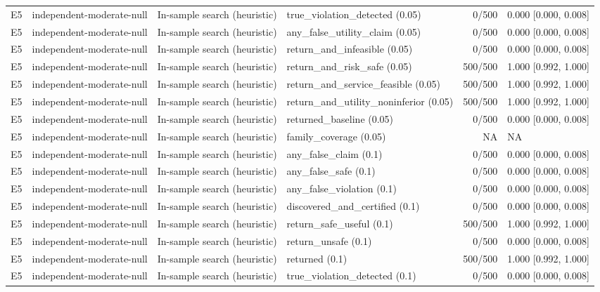 \begin{longtable}{p{.04\linewidth}p{.18\linewidth}p{.19\linewidth}p{.16\linewidth}r p{.21\linewidth}}
E5 & independent-moderate-null & In-sample search (heuristic) & true\_violation\_detected (0.05) & 0/500 & 0.000 [0.000, 0.008]\\
E5 & independent-moderate-null & In-sample search (heuristic) & any\_false\_utility\_claim (0.05) & 0/500 & 0.000 [0.000, 0.008]\\
E5 & independent-moderate-null & In-sample search (heuristic) & return\_and\_infeasible (0.05) & 0/500 & 0.000 [0.000, 0.008]\\
E5 & independent-moderate-null & In-sample search (heuristic) & return\_and\_risk\_safe (0.05) & 500/500 & 1.000 [0.992, 1.000]\\
E5 & independent-moderate-null & In-sample search (heuristic) & return\_and\_service\_feasible (0.05) & 500/500 & 1.000 [0.992, 1.000]\\
E5 & independent-moderate-null & In-sample search (heuristic) & return\_and\_utility\_noninferior (0.05) & 500/500 & 1.000 [0.992, 1.000]\\
E5 & independent-moderate-null & In-sample search (heuristic) & returned\_baseline (0.05) & 0/500 & 0.000 [0.000, 0.008]\\
E5 & independent-moderate-null & In-sample search (heuristic) & family\_coverage (0.05) & NA & NA\\
E5 & independent-moderate-null & In-sample search (heuristic) & any\_false\_claim (0.1) & 0/500 & 0.000 [0.000, 0.008]\\
E5 & independent-moderate-null & In-sample search (heuristic) & any\_false\_safe (0.1) & 0/500 & 0.000 [0.000, 0.008]\\
E5 & independent-moderate-null & In-sample search (heuristic) & any\_false\_violation (0.1) & 0/500 & 0.000 [0.000, 0.008]\\
E5 & independent-moderate-null & In-sample search (heuristic) & discovered\_and\_certified (0.1) & 0/500 & 0.000 [0.000, 0.008]\\
E5 & independent-moderate-null & In-sample search (heuristic) & return\_safe\_useful (0.1) & 500/500 & 1.000 [0.992, 1.000]\\
E5 & independent-moderate-null & In-sample search (heuristic) & return\_unsafe (0.1) & 0/500 & 0.000 [0.000, 0.008]\\
E5 & independent-moderate-null & In-sample search (heuristic) & returned (0.1) & 500/500 & 1.000 [0.992, 1.000]\\
E5 & independent-moderate-null & In-sample search (heuristic) & true\_violation\_detected (0.1) & 0/500 & 0.000 [0.000, 0.008]\\

\end{longtable}
